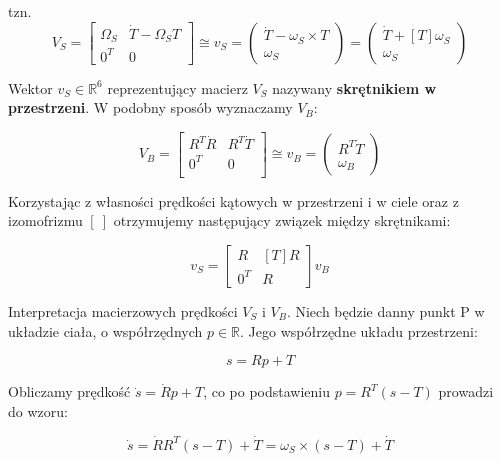 \documentclass{article}
\begin{document}
tzn.
\Large
$$
    V_{S}=
    \begin{bmatrix}
        \Omega_{S} & \dot T-\Omega_{S}T \\[0.3em]
        0^{T}      & 0
    \end{bmatrix}
    \cong
    v_{S}
    =
    \begin{pmatrix}
        \dot T-\omega_{S}\times T \\[0.3em]
        \omega_{S}
    \end{pmatrix}
    =
    \begin{pmatrix}
        \dot T + \left[T\right]\omega_{S} \\[0.3em]
        \omega_{S}
    \end{pmatrix}
$$
\normalsize
\newpage

Wektor $v_{S} \in \mathbb{R}^{6}$ reprezentujący macierz $V_{S}$ nazywany {\bf skrętnikiem w przestrzeni}. W podobny sposób wyznaczamy $V_{B}$:

$$
    V_{B}=
    \begin{bmatrix}
        R^{T}\dot R & R^{T}\dot T \\[0.3em]
        0^{T}       & 0           \\[0.3em]
    \end{bmatrix}
    \cong
    v_{B}
    =
    \begin{pmatrix}
        R^{T}\dot T \\[0.3em]
        \omega_{B}
    \end{pmatrix}
$$

Korzystając z własności prędkości kątowych w przestrzeni i w ciele oraz z izomofrizmu $\left[ \ \right]$ otrzymujemy następujący związek między skrętnikami:

$$
    v_{S}=
    \begin{bmatrix}
        R     & \left[T\right]R \\[0.3em]
        0^{T} & R
    \end{bmatrix}
    v_{B}
$$



Interpretacja macierzowych prędkości $V_{S}$ i $V_{B}$. Niech będzie danny punkt P w układzie ciała, o współrzędnych $p \in \mathbb{R}$. Jego współrzędne układu przestrzeni:

$$
    s=Rp+T
$$

Obliczamy prędkość $\dot s=\dot R p + T$, co po podstawieniu $p=R^{T}\left(s-T\right)$ prowadzi do wzoru:

$$
    \dot s = \dot R R^{T} (s-T)+\dot T= \omega_{S}\times (s-T)+\dot T
$$
\end{document}
